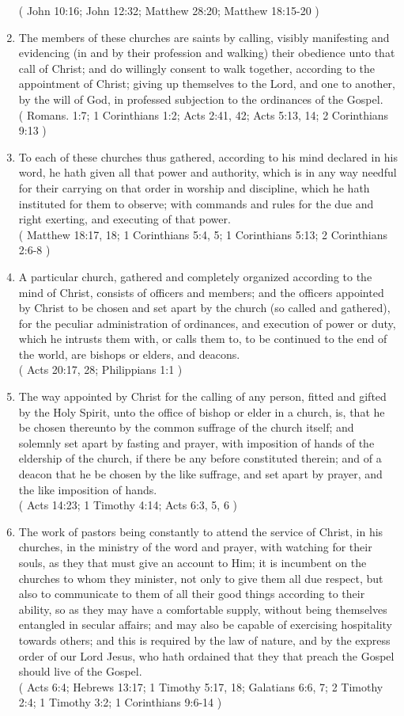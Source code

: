 \documentclass[12pt,a4paper]{book}
\begin{document}
\begin{enumerate}
( John 10:16; John 12:32; Matthew 28:20; Matthew 18:15-20 )
\item The members of these churches are saints by calling, visibly manifesting and evidencing (in and by their profession and walking) their obedience unto that call of Christ; and do willingly consent to walk together, according to the appointment of Christ; giving up themselves to the Lord, and one to another, by the will of God, in professed subjection to the ordinances of the Gospel.\\
( Romans. 1:7; 1 Corinthians 1:2; Acts 2:41, 42; Acts 5:13, 14; 2 Corinthians 9:13 )
\item To each of these churches thus gathered, according to his mind declared in his word, he hath given all that power and authority, which is in any way needful for their carrying on that order in worship and discipline, which he hath instituted for them to observe; with commands and rules for the due and right exerting, and executing of that power.\\
( Matthew 18:17, 18; 1 Corinthians 5:4, 5; 1 Corinthians 5:13; 2 Corinthians 2:6-8 )
\item A particular church, gathered and completely organized according to the mind of Christ, consists of officers and members; and the officers appointed by Christ to be chosen and set apart by the church (so called and gathered), for the peculiar administration of ordinances, and execution of power or duty, which he intrusts them with, or calls them to, to be continued to the end of the world, are bishops or elders, and deacons.\\
( Acts 20:17, 28; Philippians 1:1 )
\item The way appointed by Christ for the calling of any person, fitted and gifted by the Holy Spirit, unto the office of bishop or elder in a church, is, that he be chosen thereunto by the common suffrage of the church itself; and solemnly set apart by fasting and prayer, with imposition of hands of the eldership of the church, if there be any before constituted therein; and of a deacon that he be chosen by the like suffrage, and set apart by prayer, and the like imposition of hands.\\
( Acts 14:23; 1 Timothy 4:14; Acts 6:3, 5, 6 )
\item The work of pastors being constantly to attend the service of Christ, in his churches, in the ministry of the word and prayer, with watching for their souls, as they that must give an account to Him; it is incumbent on the churches to whom they minister, not only to give them all due respect, but also to communicate to them of all their good things according to their ability, so as they may have a comfortable supply, without being themselves entangled in secular affairs; and may also be capable of exercising hospitality towards others; and this is required by the law of nature, and by the express order of our Lord Jesus, who hath ordained that they that preach the Gospel should live of the Gospel.\\
( Acts 6:4; Hebrews 13:17; 1 Timothy 5:17, 18; Galatians 6:6, 7; 2 Timothy 2:4; 1 Timothy 3:2; 1 Corinthians 9:6-14 )


\end{enumerate}
\end{document}
